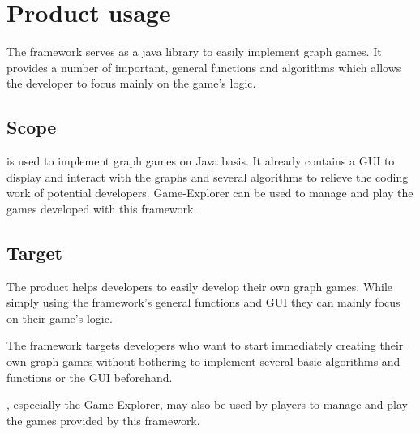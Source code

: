 \section{Product usage}
The \gls{framework} serves as a \Gls{java} \gls{library} to easily implement \gls{graph} \glspl{game}. It provides a number of important, general functions and \glspl{algorithm} which allows the \gls{developer} to focus mainly on the game's logic.

\subsection{Scope}
{\graphioli} is used to implement graph games on Java basis. It already contains a \gls{GUI} to display and interact with the graphs and several algorithms to relieve the coding work of potential developers. {\graphioli} Game-Explorer can be used to manage and play the games developed with this framework.

\subsection{Target}
The product helps developers to easily develop their own graph games. While simply using the framework's general functions and GUI they can mainly focus on their game's logic. \par
The framework targets developers who want to start immediately creating their own graph games without bothering to implement several basic algorithms and functions or the GUI beforehand. \par
{\graphioli}, especially the Game-Explorer, may also be used by \glspl{player} to manage and play the games provided by this framework.